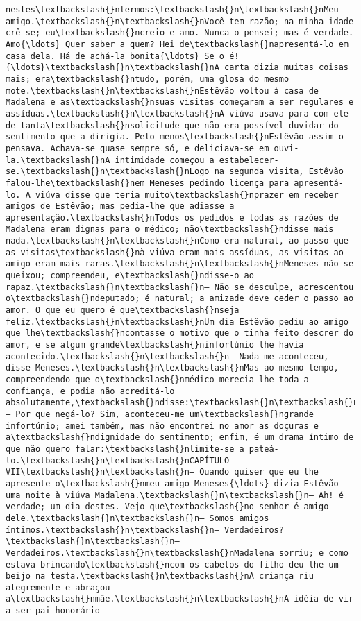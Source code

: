 \begin{Verbatim}[commandchars=\\\{\}]
nestes\textbackslash{}ntermos:\textbackslash{}n\textbackslash{}nMeu amigo.\textbackslash{}n\textbackslash{}nVocê tem razão; na minha idade crê-se; eu\textbackslash{}ncreio e amo. Nunca o pensei; mas é verdade. Amo{\ldots} Quer saber a quem? Hei de\textbackslash{}napresentá-lo em casa dela. Há de achá-la bonita{\ldots} Se o é!{\ldots}\textbackslash{}n\textbackslash{}nA carta dizia muitas coisas mais; era\textbackslash{}ntudo, porém, uma glosa do mesmo mote.\textbackslash{}n\textbackslash{}nEstêvão voltou à casa de Madalena e as\textbackslash{}nsuas visitas começaram a ser regulares e assíduas.\textbackslash{}n\textbackslash{}nA viúva usava para com ele de tanta\textbackslash{}nsolicitude que não era possível duvidar do sentimento que a dirigia. Pelo menos\textbackslash{}nEstêvão assim o pensava. Achava-se quase sempre só, e deliciava-se em ouvi-la.\textbackslash{}nA intimidade começou a estabelecer-se.\textbackslash{}n\textbackslash{}nLogo na segunda visita, Estêvão falou-lhe\textbackslash{}nem Meneses pedindo licença para apresentá-lo. A viúva disse que teria muito\textbackslash{}nprazer em receber amigos de Estêvão; mas pedia-lhe que adiasse a apresentação.\textbackslash{}nTodos os pedidos e todas as razões de Madalena eram dignas para o médico; não\textbackslash{}ndisse mais nada.\textbackslash{}n\textbackslash{}nComo era natural, ao passo que as visitas\textbackslash{}nà viúva eram mais assíduas, as visitas ao amigo eram mais raras.\textbackslash{}n\textbackslash{}nMeneses não se queixou; compreendeu, e\textbackslash{}ndisse-o ao rapaz.\textbackslash{}n\textbackslash{}n— Não se desculpe, acrescentou o\textbackslash{}ndeputado; é natural; a amizade deve ceder o passo ao amor. O que eu quero é que\textbackslash{}nseja feliz.\textbackslash{}n\textbackslash{}nUm dia Estêvão pediu ao amigo que lhe\textbackslash{}ncontasse o motivo que o tinha feito descrer do amor, e se algum grande\textbackslash{}ninfortúnio lhe havia acontecido.\textbackslash{}n\textbackslash{}n— Nada me aconteceu, disse Meneses.\textbackslash{}n\textbackslash{}nMas ao mesmo tempo, compreendendo que o\textbackslash{}nmédico merecia-lhe toda a confiança, e podia não acreditá-lo absolutamente,\textbackslash{}ndisse:\textbackslash{}n\textbackslash{}n— Por que negá-lo? Sim, aconteceu-me um\textbackslash{}ngrande infortúnio; amei também, mas não encontrei no amor as doçuras e a\textbackslash{}ndignidade do sentimento; enfim, é um drama íntimo de que não quero falar:\textbackslash{}nlimite-se a pateá-lo.\textbackslash{}n\textbackslash{}nCAPÍTULO VII\textbackslash{}n\textbackslash{}n— Quando quiser que eu lhe apresente o\textbackslash{}nmeu amigo Meneses{\ldots} dizia Estêvão uma noite à viúva Madalena.\textbackslash{}n\textbackslash{}n— Ah! é verdade; um dia destes. Vejo que\textbackslash{}no senhor é amigo dele.\textbackslash{}n\textbackslash{}n— Somos amigos íntimos.\textbackslash{}n\textbackslash{}n— Verdadeiros?\textbackslash{}n\textbackslash{}n— Verdadeiros.\textbackslash{}n\textbackslash{}nMadalena sorriu; e como estava brincando\textbackslash{}ncom os cabelos do filho deu-lhe um beijo na testa.\textbackslash{}n\textbackslash{}nA criança riu alegremente e abraçou a\textbackslash{}nmãe.\textbackslash{}n\textbackslash{}nA idéia de vir a ser pai honorário 
\end{Verbatim}

